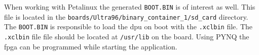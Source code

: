 When working with Petalinux the generated \texttt{BOOT.BIN} is of interest as well.
This file is located in the \texttt{boards/Ultra96/binary\_container\_1/sd\_card} directory.
The \texttt{BOOT.BIN} is responsible to load the \acrshort{dpu} on boot with the \texttt{.xclbin} file.
The \texttt{.xclbin} file file should be located at \texttt{/usr/lib} on the board.
Using PYNQ the \acrshort{fpga} can be programmed while starting the application.
